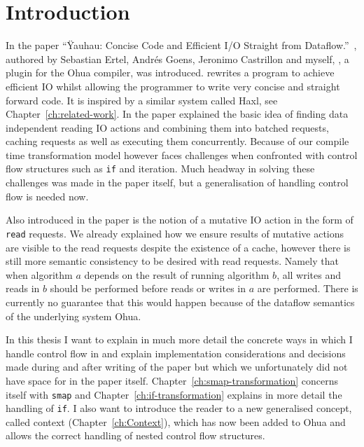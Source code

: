 \chapter{Introduction}

\label{ch:Intro}



In the paper ``Ÿauhau: Concise Code and Efficient I/O Straight from Dataflow.''~\cite{ErtelGoensAdamEtAl2016}, authored by Sebastian Ertel, Andrés Goens, Jeronimo Castrillon and myself, \yauhau{}, a plugin for the Ohua\cite{Ertel:2015:OID:2807426.2807431}\cite{Ohua:library:link} compiler, was introduced.
\yauhau{} rewrites a program to achieve efficient IO whilst allowing the programmer to write very concise and straight forward code.
It is inspired by a similar system called Haxl, see Chapter~\ref{ch:related-work}.
In the paper explained the basic idea of finding data independent reading IO actions and combining them into batched requests, caching requests as well as executing them concurrently.
Because of our compile time transformation model however \yauhau{} faces challenges when confronted with control flow structures such as \texttt{if} and iteration.
Much headway in solving these challenges was made in the paper itself, but a generalisation of handling control flow is needed now.

Also introduced in the paper is the notion of a mutative IO action in the form of \texttt{read} requests.
We already explained how we ensure results of mutative actions are visible to the read requests despite the existence of a cache, however there is still more semantic consistency to be desired with read requests.
Namely that when algorithm $a$ depends on the result of running algorithm $b$, all writes and reads in $b$ should be performed before reads or writes in $a$ are performed.
There is currently no guarantee that this would happen because of the dataflow semantics of the underlying system Ohua.

In this thesis I want to explain in much more detail the concrete ways in which I handle control flow in \yauhau{} and explain implementation considerations and decisions made during and after writing of the paper but which we unfortunately did not have space for in the paper itself.
Chapter~\ref{ch:smap-transformation} concerns itself with \texttt{smap} and Chapter~\ref{ch:if-transformation} explains in more detail the handling of \texttt{if}.
I also want to introduce the reader to a new generalised concept, called context (Chapter~\ref{ch:Context}), which has now been added to Ohua and allows the correct handling of nested control flow structures.

